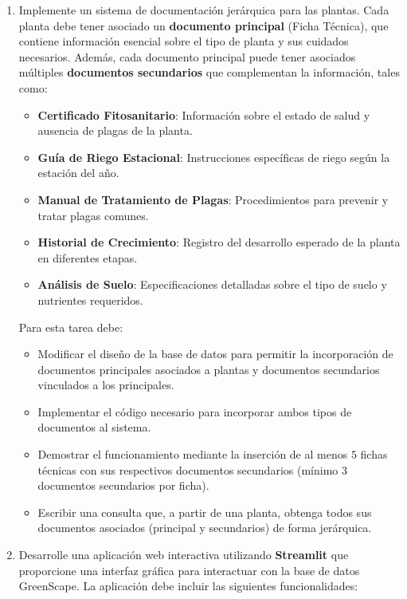\documentclass[10pt]{article}
\begin{document}
\begin{enumerate}
		\item Implemente un sistema de documentación jerárquica para las plantas. Cada planta debe tener asociado un \textbf{documento principal} (Ficha Técnica), que contiene información esencial sobre el tipo de planta y sus cuidados necesarios. Además, cada documento principal puede tener asociados múltiples \textbf{documentos secundarios} que complementan la información, tales como:
		
		\begin{itemize}
			\item \textbf{Certificado Fitosanitario}: Información sobre el estado de salud y ausencia de plagas de la planta.
			\item \textbf{Guía de Riego Estacional}: Instrucciones específicas de riego según la estación del año.
			\item \textbf{Manual de Tratamiento de Plagas}: Procedimientos para prevenir y tratar plagas comunes.
			\item \textbf{Historial de Crecimiento}: Registro del desarrollo esperado de la planta en diferentes etapas.
			\item \textbf{Análisis de Suelo}: Especificaciones detalladas sobre el tipo de suelo y nutrientes requeridos.
		\end{itemize}
		
		Para esta tarea debe:
		
		\begin{itemize}
			\item Modificar el diseño de la base de datos para permitir la incorporación de documentos principales asociados a plantas y documentos secundarios vinculados a los principales.
			\item Implementar el código necesario para incorporar ambos tipos de documentos al sistema.
			\item Demostrar el funcionamiento mediante la inserción de al menos $5$ fichas técnicas con sus respectivos documentos secundarios (mínimo $3$ documentos secundarios por ficha).
			\item Escribir una consulta que, a partir de una planta, obtenga todos sus documentos asociados (principal y secundarios) de forma jerárquica.
		\end{itemize}
		
		\item Desarrolle una aplicación web interactiva utilizando \textbf{Streamlit} que proporcione una interfaz gráfica para interactuar con la base de datos GreenScape. La aplicación debe incluir las siguientes funcionalidades:
		

\end{enumerate}
\end{document}
